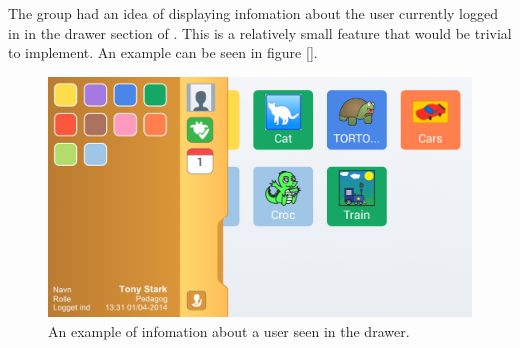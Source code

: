 The group had an idea of displaying infomation about the user currently logged in in the drawer section of \launcher.
This is a relatively small feature that would be trivial to implement.
An example can be seen in figure \ref{}.

\begin{figure}[p]
    \includegraphics[width=\textwidth]{figures/sprint2/profil-info}
    \caption{An example of infomation about a user seen in the drawer.}
    \label{fig:appsettingsprototype}
\end{figure}
